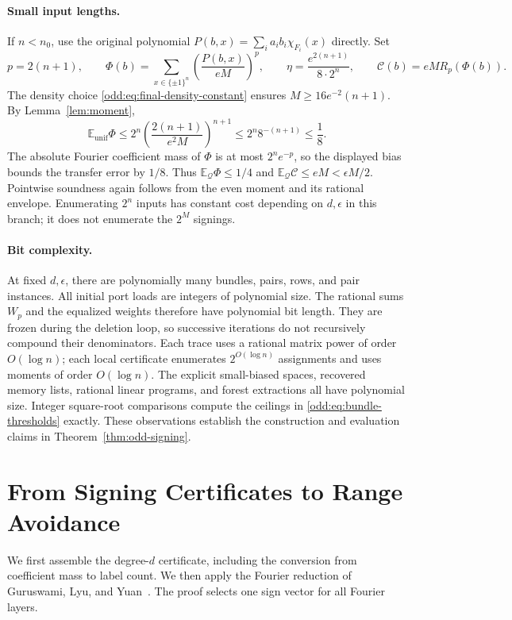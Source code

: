 \documentclass[letterpaper,11pt]{article}
\theoremstyle{definition}
\newcommand{\E}{\mathbb E}
\begin{document}
\paragraph{Small input lengths.}
If $n<n_0$, use the original polynomial
$P(b,x)=\sum_i a_i b_i\chi_{F_i}(x)$ directly.  Set
\[
 p=2(n+1),\qquad
 \Phi(b)=\sum_{x\in\{\pm1\}^n}
                   \left(\frac{P(b,x)}{eM}\right)^p,
 \qquad
 \eta=\frac{e^{2(n+1)}}{8\cdot2^n},
 \qquad \mathcal C(b)=eM R_p(\Phi(b)).
\]
The density choice \eqref{odd:eq:final-density-constant} ensures
$M\geq16e^{-2}(n+1)$.  By Lemma~\ref{lem:moment},
\[
 \E_{\mathrm{unif}}\Phi
 \leq2^n\left(\frac{2(n+1)}{e^2M}\right)^{n+1}
 \leq2^n8^{-(n+1)}\leq\frac18.
\]
The absolute Fourier coefficient mass of $\Phi$ is at most
$2^ne^{-p}$, so the displayed bias bounds the transfer error by $1/8$.
Thus $\E_{\mathcal Q}\Phi\leq1/4$ and
$\E_{\mathcal Q}\mathcal C\leq eM<\epsilon M/2$.
Pointwise soundness again follows from the even moment and its rational
envelope.  Enumerating $2^n$ inputs has constant cost depending on
$d,\epsilon$ in this branch; it does not enumerate the $2^M$ signings.

\paragraph{Bit complexity.}
At fixed $d,\epsilon$, there are polynomially many bundles, pairs, rows,
and pair instances.  All initial port loads are integers of polynomial
size.  The rational sums $W_p$ and the equalized weights therefore have
polynomial bit length.  They are frozen during the deletion loop, so
successive iterations do not recursively compound their denominators.
Each trace uses a rational matrix power of order $O(\log n)$; each local
certificate enumerates $2^{O(\log n)}$ assignments and uses moments of
order $O(\log n)$.  The explicit small-biased spaces, recovered memory
lists, rational linear programs, and forest extractions all have
polynomial size.  Integer square-root comparisons compute the ceilings
in \eqref{odd:eq:bundle-thresholds} exactly.  These observations establish
the construction and evaluation claims in Theorem~\ref{thm:odd-signing}.



\section{From Signing Certificates to Range Avoidance}
\label{sec:avoidance}

We first assemble the degree-$d$ certificate, including the conversion
from coefficient mass to label count. We then apply the Fourier
reduction of Guruswami, Lyu, and Yuan~\cite[Section~6.1]{GLY26}.
The proof selects one sign vector for all Fourier layers.
\end{document}
